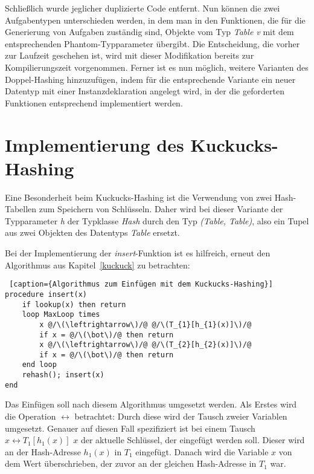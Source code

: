 Schließlich wurde jeglicher duplizierte Code entfernt. Nun können die zwei Aufgabentypen unterschieden werden, in dem man in den Funktionen, die für die Generierung von Aufgaben zuständig sind, Objekte vom Typ \textit{Table v} mit dem entsprechenden Phantom-Typparameter übergibt. Die Entscheidung, die vorher zur Laufzeit geschehen ist, wird mit dieser Modifikation bereits zur Kompilierungszeit vorgenommen. Ferner ist es nun möglich, weitere Varianten des Doppel-Hashing hinzuzufügen, indem für die entsprechende Variante ein neuer Datentyp mit einer Instanzdeklaration angelegt wird, in der die geforderten Funktionen entsprechend implementiert werden. 

\section{Implementierung des Kuckucks-Hashing}\label{kuckimpl}
Eine Besonderheit beim Kuckucks-Hashing ist die Verwendung von zwei Hash-Tabellen zum Speichern von Schlüsseln. Daher wird bei dieser Variante der Typparameter \textit{h} der Typklasse \textit{Hash} durch den Typ \textit{(Table, Table)}, also ein Tupel aus zwei Objekten des Datentyps \textit{Table} ersetzt. 

Bei der Implementierung der \textit{insert}-Funktion ist es hilfreich, erneut den Algorithmus aus Kapitel~\ref{kuckuck} zu betrachten:
\begin{lstlisting} [caption={Algorithmus zum Einfügen mit dem Kuckucks-Hashing}]
procedure insert(x)
	if lookup(x) then return
	loop MaxLoop times
		x @/\(\leftrightarrow\)/@ @/\(T_{1}[h_{1}(x)]\)/@
		if x = @/\(\bot\)/@ then return
		x @/\(\leftrightarrow\)/@ @/\(T_{2}[h_{2}(x)]\)/@
		if x = @/\(\bot\)/@ then return
	end loop
	rehash(); insert(x)
end
\end{lstlisting}
Das Einfügen soll nach diesem Algorithmus umgesetzt werden. Als Erstes wird die Operation \(\leftrightarrow\) betrachtet: Durch diese wird der Tausch zweier Variablen umgesetzt. Genauer auf diesen Fall spezifiziert ist bei einem Tausch \(x\leftrightarrow{}T_{1}[h_{1}(x)]\) \(x\) der aktuelle Schlüssel, der eingefügt werden soll. Dieser wird an der Hash-Adresse \(h_{1}(x)\) in \(T_{1}\) eingefügt. Danach wird die Variable \(x\) von dem Wert überschrieben, der zuvor an der gleichen Hash-Adresse in \(T_{1}\) war. 

